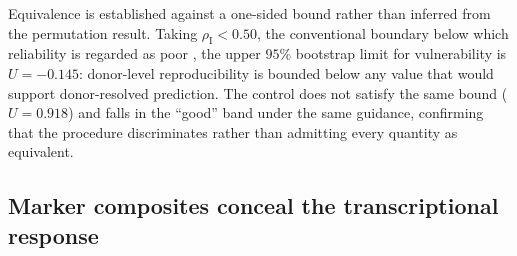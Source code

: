 \documentclass[5p,times,twocolumn]{elsarticle}
\begin{document}
Equivalence is established against a one-sided bound rather than inferred from
the permutation result. Taking $\rho_\mathrm{I}<0.50$, the conventional boundary
below which reliability is regarded as poor \cite{koo2016guideline}, the upper
$95\%$ bootstrap limit for vulnerability is $U=-0.145$: donor-level
reproducibility is bounded below any value that would support donor-resolved
prediction. The control does not satisfy the same bound ($U=0.918$) and falls in
the ``good'' band under the same guidance, confirming that the procedure
discriminates rather than admitting every quantity as equivalent.


\subsection{\textbf{Marker composites conceal the transcriptional response}}
\end{document}

